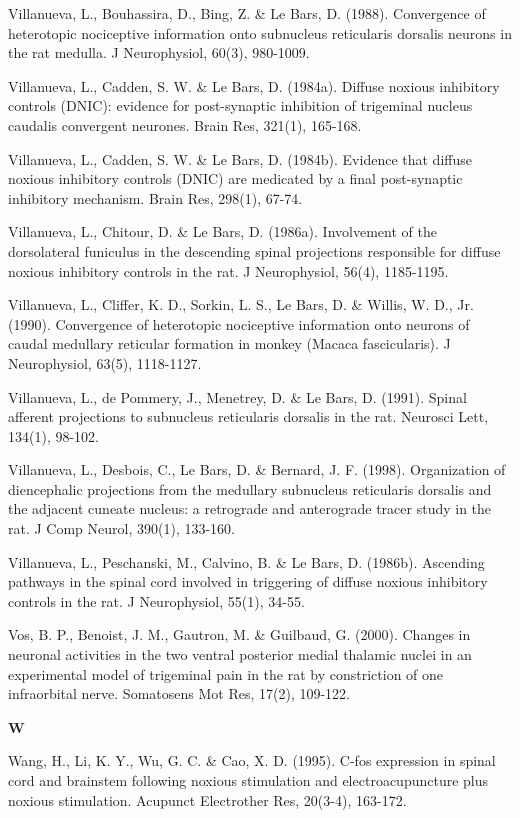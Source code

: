 \documentclass[a4paper,12pt,twoside]{report}
\begin{document}
\begin{singlespacing}
\begin{footnotesize}
Villanueva, L., Bouhassira, D., Bing, Z. \& Le Bars, D. (1988). Convergence of heterotopic nociceptive information onto subnucleus reticularis dorsalis neurons in the rat medulla. J Neurophysiol, 60(3), 980-1009.

Villanueva, L., Cadden, S. W. \& Le Bars, D. (1984a). Diffuse noxious inhibitory controls (DNIC): evidence for post-synaptic inhibition of trigeminal nucleus caudalis convergent neurones. Brain Res, 321(1), 165-168.

Villanueva, L., Cadden, S. W. \& Le Bars, D. (1984b). Evidence that diffuse noxious inhibitory controls (DNIC) are medicated by a final post-synaptic inhibitory mechanism. Brain Res, 298(1), 67-74.

Villanueva, L., Chitour, D. \& Le Bars, D. (1986a). Involvement of the dorsolateral funiculus in the descending spinal projections responsible for diffuse noxious inhibitory controls in the rat. J Neurophysiol, 56(4), 1185-1195.

Villanueva, L., Cliffer, K. D., Sorkin, L. S., Le Bars, D. \& Willis, W. D., Jr. (1990). Convergence of heterotopic nociceptive information onto neurons of caudal medullary reticular formation in monkey (Macaca fascicularis). J Neurophysiol, 63(5), 1118-1127.

Villanueva, L., de Pommery, J., Menetrey, D. \& Le Bars, D. (1991). Spinal afferent projections to subnucleus reticularis dorsalis in the rat. Neurosci Lett, 134(1), 98-102.

Villanueva, L., Desbois, C., Le Bars, D. \& Bernard, J. F. (1998). Organization of diencephalic projections from the medullary subnucleus reticularis dorsalis and the adjacent cuneate nucleus: a retrograde and anterograde tracer study in the rat. J Comp Neurol, 390(1), 133-160.

Villanueva, L., Peschanski, M., Calvino, B. \& Le Bars, D. (1986b). Ascending pathways in the spinal cord involved in triggering of diffuse noxious inhibitory controls in the rat. J Neurophysiol, 55(1), 34-55.

Vos, B. P., Benoist, J. M., Gautron, M. \& Guilbaud, G. (2000). Changes in neuronal activities in the two ventral posterior medial thalamic nuclei in an experimental model of trigeminal pain in the rat by constriction of one infraorbital nerve. Somatosens Mot Res, 17(2), 109-122.

\medskip
\begin{Large}\textbf{W}\end{Large}

Wang, H., Li, K. Y., Wu, G. C. \& Cao, X. D. (1995). C-fos expression in spinal cord and brainstem following noxious stimulation and electroacupuncture plus noxious stimulation. Acupunct Electrother Res, 20(3-4), 163-172.


\end{footnotesize}
\end{singlespacing}
\end{document}
